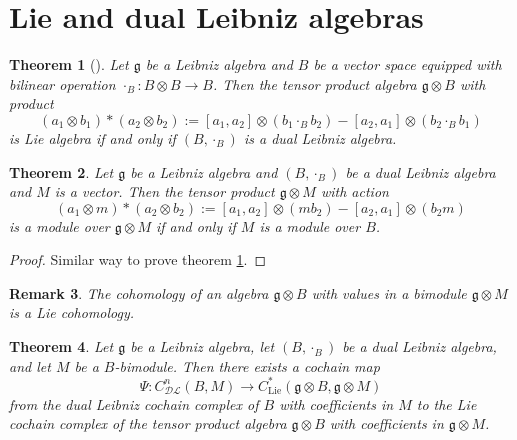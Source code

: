 \documentclass[a4paper, 12pt,oneside,reqno]{amsart}
\newcommand{\DL}{\mathcal{DL}}
\newcommand{\cochain}[2]{C^{#1}_{\DL}(#2)}
\newtheorem{theorem}{Theorem}[section]
\newtheorem{remark}[theorem]{Remark}
\begin{document}
\section{Lie and dual Leibniz  algebras}
\begin{theorem}[\cite{Loday}]\label{4.1}
Let $\mathfrak{g}$ be a Leibniz algebra  and $B$ be a vector space equipped with  bilinear operation $\cdot_B : B \otimes B \to B$. Then the tensor product algebra $\mathfrak{g} \otimes B$ with product
\[
(a_1 \otimes b_1)\ast  (a_2 \otimes b_2) := [a_1 , a_2] \otimes (b_1 \cdot_B b_2) - [a_2 ,a_1]\otimes(b_2 \cdot_B b_1)
\]
is Lie algebra  if and only if $(B, \cdot_B)$ is a dual Leibniz  algebra.
\end{theorem}

\begin{theorem}\label{thm:4.2}
Let $\mathfrak{g}$ be a Leibniz algebra and $(B,\cdot_B)$ be a dual Leibniz  algebra and $M$ is a vector. Then the tensor product $\mathfrak{g} \otimes M$ with action
\[
(a_1 \otimes m)\ast  (a_2 \otimes b_2) := [a_1 , a_2] \otimes (m b_2) - [a_2 ,a_1]\otimes(b_2 m)
\]
is a module over $\mathfrak{g}\otimes M$ if and only if $M$ is a module over $B$. 
\end{theorem}
\begin{proof}
    Similar way to prove theorem \ref{4.1}.
\end{proof}
\begin{remark}
    The cohomology of an algebra 
$\mathfrak{g}\otimes B$
 with values in a bimodule 
$\mathfrak{g}\otimes M$ is a Lie cohomology.
\end{remark}
\begin{theorem}\label{5.4}
Let $\mathfrak{g}$ be a Leibniz algebra, let \((B, \cdot_B)\) be a dual Leibniz algebra, and let \(M\) be a \(B\)-bimodule. Then there exists a cochain map
\[
\Psi : \cochain{n}{B, M} \rightarrow C^*_{\mathrm{Lie}}(\mathfrak{g} \otimes B, \mathfrak{g} \otimes M)
\]
from the dual Leibniz cochain complex of \(B\) with coefficients in \(M\) to the Lie cochain complex of the tensor product algebra  \(\mathfrak{g} \otimes B\) with coefficients in \(\mathfrak{g} \otimes M\).
\end{theorem}
\end{document}

